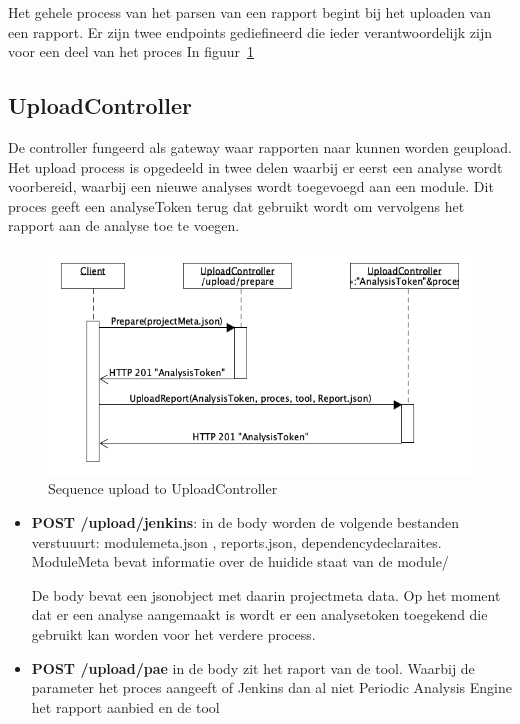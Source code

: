 Het gehele process van het parsen van een rapport begint bij het uploaden van een rapport. Er zijn twee endpoints gediefineerd die ieder verantwoordelijk zijn voor een deel van het proces
In figuur~\ref{fig:SequenceClientUploadReport}

\subsection{UploadController}\label{subsec:uploadcontroller}
De controller fungeerd als gateway waar rapporten naar kunnen worden geupload. Het upload process is opgedeeld in twee delen waarbij er eerst een analyse wordt voorbereid, waarbij een nieuwe analyses wordt toegevoegd aan een module. Dit proces geeft een analyseToken terug dat gebruikt wordt om vervolgens het rapport aan de analyse toe te voegen.
\begin{figure}[bth]
    \myfloatalign
    \includegraphics[width=12cm]{gfx/umlet/exports/SeqAddReport}
    \caption{Sequence upload to UploadController}
    \label{fig:SequenceClientUploadReport}
\end{figure}

\begin{itemize}
    \item \textbf{POST /upload/jenkins}: in de body worden de volgende bestanden verstuuurt: modulemeta.json , reports.json, dependencydeclaraites. ModuleMeta bevat informatie over de huidide staat van de module/

    De body bevat een jsonobject met daarin projectmeta data. Op het moment dat er een analyse aangemaakt is wordt er een analysetoken toegekend die gebruikt kan worden voor het verdere process.
    \item \textbf{POST /upload/pae} in de body zit het raport van de tool. Waarbij de parameter het proces aangeeft of Jenkins dan al niet Periodic Analysis Engine het rapport aanbied en de tool
\end{itemize}

